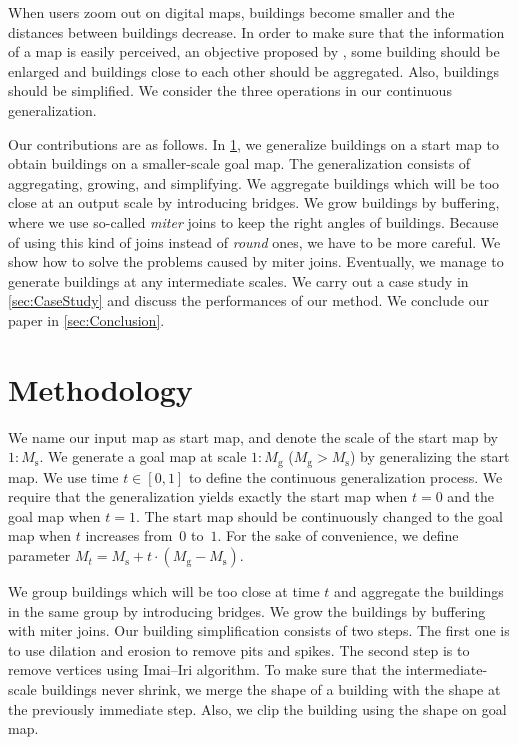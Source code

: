 When users zoom out on digital maps, 
buildings become smaller and the distances between buildings decrease. 
In order to make sure that the information of a map is easily perceived, 
an objective proposed by \citet{Weibel1997}, 
some building should be enlarged
and buildings close to each other should be aggregated.
Also, buildings should be simplified.
We consider the three operations in our continuous generalization.


Our contributions are as follows.
In \sect\ref{sec:Methodology},
we generalize buildings on a start map 
to obtain buildings on a smaller-scale goal map.
The generalization consists of aggregating, growing, and simplifying.
We aggregate buildings which will be too close at an output scale 
by introducing bridges.
We grow buildings by buffering,
where we use so-called \emph{miter} joins to keep the right angles of buildings.
Because of using this kind of joins instead of \emph{round} ones,
we have to be more careful.
We show how to solve the problems caused by miter joins.
Eventually, we manage to generate buildings at any intermediate scales.
We carry out a case study in \sect\ref{sec:CaseStudy}
and discuss the performances of our method.
We conclude our paper in \sect\ref{sec:Conclusion}.



\section{Methodology}
\label{sec:Methodology}
We name our input map as start map,
and denote the scale of the start map by $1:M_\mathrm{s}$.
We generate a goal map at scale $1:M_\mathrm{g}$ 
($M_\mathrm{g} > M_\mathrm{s}$) by generalizing the start map. 
We use time $t\in[0,1]$ to define the continuous generalization
process. 
We require that the generalization yields exactly the start map when $t=0$ 
and the goal map when $t=1$.
The start map should be continuously changed to the goal map 
when $t$ increases from~$0$ to~$1$.
For the sake of convenience, we define parameter
$M_t= M_\mathrm{s} + t \cdot (M_\mathrm{g}-M_\mathrm{s})$.

We group buildings which will be too close at time $t$
and aggregate the buildings in the same group by introducing bridges.
We grow the buildings by buffering with miter joins.
Our building simplification consists of two steps.
The first one is to use dilation and erosion to remove pits and spikes.
The second step is to remove vertices using Imai--Iri algorithm.
To make sure that the intermediate-scale buildings never shrink,
we merge the shape of a building with the shape at the previously immediate 
step. 
Also, we clip the building using the shape on goal map.


